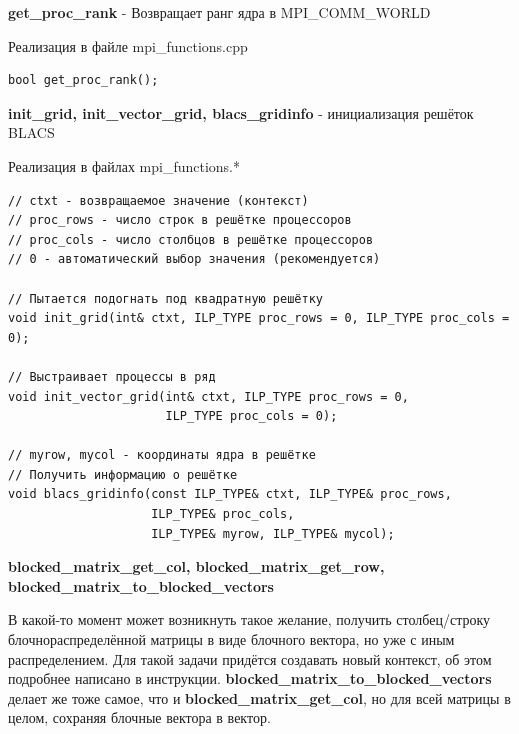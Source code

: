 \documentclass[12pt,fleqn]{article}
\begin{document}
    \begin{center}
        \textbf{get\_proc\_rank} - Возвращает ранг ядра в MPI\_COMM\_WORLD
    \end{center}

    Реализация в файле \textsf{mpi\_functions.cpp}

\begin{mdframed}[linecolor=black, topline=true, bottomline=true,
leftline=false, rightline=false]
\begin{verbatim}
bool get_proc_rank();
\end{verbatim}
\end{mdframed}


    \begin{center}
            \textbf{init\_grid, init\_vector\_grid, blacs\_gridinfo} - инициализация решёток BLACS
    \end{center}

        Реализация в файлах \textsf{mpi\_functions.*}

\begin{mdframed}[linecolor=black, topline=true, bottomline=true,
    leftline=false, rightline=false]
\begin{verbatim}
// ctxt - возвращаемое значение (контекст)
// proc_rows - число строк в решётке процессоров
// proc_cols - число столбцов в решётке процессоров
// 0 - автоматический выбор значения (рекомендуется)

// Пытается подогнать под квадратную решётку
void init_grid(int& ctxt, ILP_TYPE proc_rows = 0, ILP_TYPE proc_cols = 0);

// Выстраивает процессы в ряд
void init_vector_grid(int& ctxt, ILP_TYPE proc_rows = 0, 
                      ILP_TYPE proc_cols = 0);

// myrow, mycol - координаты ядра в решётке
// Получить информацию о решётке
void blacs_gridinfo(const ILP_TYPE& ctxt, ILP_TYPE& proc_rows,
                    ILP_TYPE& proc_cols, 
                    ILP_TYPE& myrow, ILP_TYPE& mycol);
\end{verbatim}
\end{mdframed}


\begin{center}\textbf{blocked\_matrix\_get\_col, blocked\_matrix\_get\_row, blocked\_matrix\_to\_blocked\_vectors}\end{center}

        В какой-то момент может возникнуть такое желание, получить столбец/строку блочнораспределённой матрицы в виде блочного вектора, но уже с иным распределением. 
        Для такой задачи придётся создавать новый контекст, об этом подробнее написано в инструкции. 
        \textbf{blocked\_matrix\_to\_blocked\_vectors} делает же тоже самое, что и \textbf{blocked\_matrix\_get\_col}, но для всей матрицы в целом, сохраняя блочные вектора в вектор.
\end{document}
